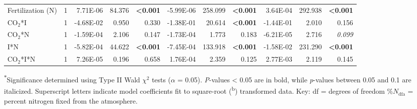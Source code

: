 \begin{landscape}
\begin{table}
{\begin{tabular}{p{3.5cm}p{0.5cm}p{1.75cm}p{1.5cm}p{1.5cm}p{1.75cm}p{1.5cm}p{1.5cm}p{1.75cm}p{1.5cm}p{1.5cm}}
            Fertilization (N) & \multicolumn{1}{r}{1}
            & \multicolumn{1}{r}{7.71E-06}      & \multicolumn{1}{r}{84.376}        & \multicolumn{1}{r}{\textbf{<0.001}}
            & \multicolumn{1}{r}{-5.99E-06}     & \multicolumn{1}{r}{258.099}       & \multicolumn{1}{r}{\textbf{<0.001}}
            & \multicolumn{1}{r}{3.64E-04}      & \multicolumn{1}{r}{292.938}       & \multicolumn{1}{r}{\textbf{<0.001}} 
            \\

            CO$_2$*I & \multicolumn{1}{r}{1}
            & \multicolumn{1}{r}{-4.68E-02}     & \multicolumn{1}{r}{0.950}         & \multicolumn{1}{r}{0.330}
            & \multicolumn{1}{r}{-1.38E-01}     & \multicolumn{1}{r}{20.614}        & \multicolumn{1}{r}{\textbf{<0.001}}
            & \multicolumn{1}{r}{-1.44E-01}     & \multicolumn{1}{r}{2.010}         & \multicolumn{1}{r}{0.156} 
            \\

            CO$_2$*N & \multicolumn{1}{r}{1}
            & \multicolumn{1}{r}{-1.59E-04}     & \multicolumn{1}{r}{2.106}         & \multicolumn{1}{r}{0.147}
            & \multicolumn{1}{r}{-1.73E-04}     & \multicolumn{1}{r}{1.773}         & \multicolumn{1}{r}{0.183}
            & \multicolumn{1}{r}{-6.21E-05}     & \multicolumn{1}{r}{2.716}         & \multicolumn{1}{r}{\textit{0.099}} 
            \\

            I*N & \multicolumn{1}{r}{1}
            & \multicolumn{1}{r}{-5.82E-04}     & \multicolumn{1}{r}{44.622}        & \multicolumn{1}{r}{\textbf{<0.001}}
            & \multicolumn{1}{r}{-7.45E-04}     & \multicolumn{1}{r}{133.918}       & \multicolumn{1}{r}{\textbf{<0.001}}
            & \multicolumn{1}{r}{-1.58E-02}     & \multicolumn{1}{r}{231.290}       & \multicolumn{1}{r}{\textbf{<0.001}} 
            \\

            CO$_2$*I*N & \multicolumn{1}{r}{1}
            & \multicolumn{1}{r}{7.26E-05}      & \multicolumn{1}{r}{0.196}         & \multicolumn{1}{r}{0.658}
            & \multicolumn{1}{r}{1.76E-04}      & \multicolumn{1}{r}{2.359}         & \multicolumn{1}{r}{0.125}
            & \multicolumn{1}{r}{2.77E-03}      & \multicolumn{1}{r}{2.119}         & \multicolumn{1}{r}{0.145} 
            \\
            \hline
    \end{tabular}}
    \label{tab:table5.5}
    \end{table}
\begin{singlespace}
    \noindent \textsuperscript{$*$}Significance determined using Type II Wald $\chi^{2}$ tests ($\alpha$ = 0.05). \textit{P}-values < 0.05 are in bold, while \textit{p}-values between 0.05 and 0.1 are italicized. Superscript letters indicate model coefficients fit to square-root (\textsuperscript{b}) transformed data. Key: df = degrees of freedom \%$N_\mathrm{dfa}$ = percent nitrogen fixed from the atmosphere.
\end{singlespace}
\end{landscape}
\clearpage

